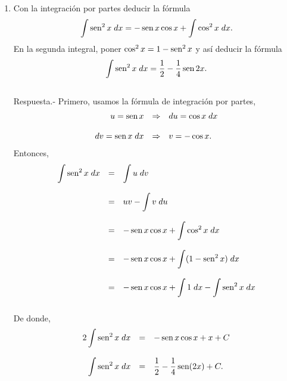 \begin{enumerate}[\bfseries 1.]
	\item Con la integración por partes deducir la fórmula
	$$\int \sen^2 x\; dx = -\sen x \cos x + \int \cos^2 x\; dx.$$
	En la segunda integral, poner $\cos^2 x = 1-\sen^2 x$ y así deducir la fórmula
	$$\int \sen^2 x \; dx = \dfrac{1}{2}-\dfrac{1}{4}\sen 2x.$$\\
	    Respuesta.-\; Primero, usamos la fórmula de integración por partes,
	    $$\begin{array}{rcl}
		u=\sen x &\Rightarrow& du=\cos x\; dx\\\\
		dv=\sen x\; dx &\Rightarrow& v=-\cos x.
	    \end{array}$$
	    Entonces,
	    $$\begin{array}{rcl}
		\displaystyle\int \sen^2 x\; dx &=& \displaystyle\int u\; dv\\\\
					       &=& uv - \displaystyle\int v\; du\\\\
					       &=& -\sen x \cos x + \displaystyle\int \cos^2 x\; dx\\\\
					       &=& -\sen x \cos x + \displaystyle\int (1-\sen^2 x)\; dx\\\\
					       &=& -\sen x \cos x + \displaystyle\int 1\; dx - \int \sen^2 x\; dx\\\\

	    \end{array}$$
	    De donde,
	    $$\begin{array}{rcl}
		2\displaystyle\int \sen^2 x\; dx &=& -\sen x \cos x + x + C\\\\
		\displaystyle\int \sen^2 x\; dx &=& \dfrac{1}{2}-\dfrac{1}{4}\sen(2x)+C.
	    \end{array}$$
	    \vspace{0.5cm}


\end{enumerate}
